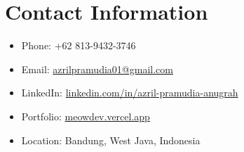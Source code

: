 \section*{Contact Information}

\begin{itemize}
    \item Phone: +62 813-9432-3746
    \item Email: \href{mailto:azrilpramudia01@gmail.com}{azrilpramudia01@gmail.com}
    \item LinkedIn: \href{https://linkedin.com/in/azril-pramudia-anugrah}{linkedin.com/in/azril-pramudia-anugrah}
    \item Portfolio: \href{https://meowdev.vercel.app}{meowdev.vercel.app}
    \item Location: Bandung, West Java, Indonesia
\end{itemize}
